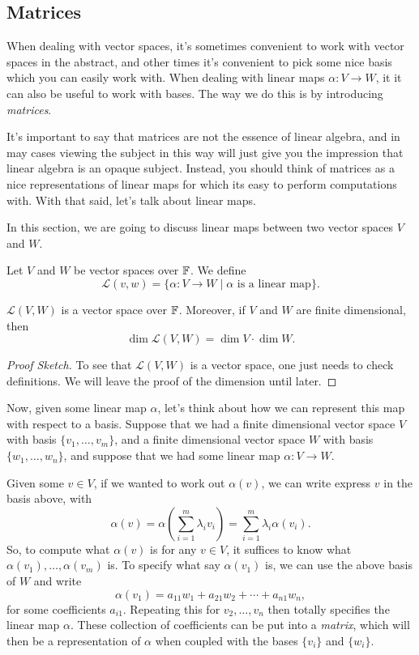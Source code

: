 \documentclass[a4paper]{scrartcl}
\begin{document}
\subsection{Matrices}

When dealing with vector spaces, it's sometimes convenient to work with vector spaces in the abstract, and other times it's convenient to pick some nice basis which you can easily work with.
When dealing with linear maps $\alpha: V \rightarrow W$, it it can also be useful to work with bases. The way we do this is by introducing \emph{matrices}.

It's important to say that matrices are not the essence of linear algebra, and in may cases viewing the subject in this way will just give you the impression that linear algebra is an opaque subject. Instead, you should think of matrices as a nice representations of linear maps for which its easy to perform computations with.
With that said, let's talk about linear maps.

In this section, we are going to discuss linear maps between two vector spaces $V$ and $W$.

\begin{definition}
    Let $V$ and $W$ be vector spaces over $\mathbb{F}$. We define
    $$
    \mathcal{L}(v, w) = \{\alpha: V \rightarrow W \mid \alpha \text{ is a linear map}\}.
    $$
\end{definition}

\begin{proposition}
    $\mathcal{L}(V, W)$ is a vector space over $\mathbb{F}$. Moreover, if $V$ and $W$ are finite dimensional, then
    $$
    \dim \mathcal{L}(V, W) = \dim V \cdot \dim W.
    $$
\end{proposition}
\begin{proof}[Proof Sketch]    
    To see that $\mathcal{L}(V, W)$ is a vector space, one just needs to check definitions. We will leave the proof of the dimension until later.
\end{proof}

Now, given some linear map $\alpha$, let's think about how we can represent this map with respect to a basis.
Suppose that we had a finite dimensional vector space $V$ with basis $\{v_1, \dots, v_m\}$, and a finite dimensional vector space $W$ with basis $\{w_1, \dots, w_n\}$, and suppose that we had some linear map $\alpha : V \rightarrow W$.

Given some $v \in V$, if we wanted to work out $\alpha(v)$, we can write express $v$ in the basis above, with
$$
\alpha(v) = \alpha\left(\sum_{i = 1}^m \lambda_i v_i\right) = \sum_{i = 1}^m \lambda_i \alpha(v_i).
$$
So, to compute what $\alpha(v)$ is for any $v \in V$, it suffices to know what $\alpha(v_1), \dots, \alpha(v_m)$ is. To specify what say $\alpha(v_1)$ is, we can use the above basis of $W$ and write
$$
\alpha(v_1) = a_{11} w_1 + a_{21} w_2 + \cdots + a_{n1} w_n,
$$
for some coefficients $a_{i1}$. Repeating this for $v_2, \dots, v_n$ then totally specifies the linear map $\alpha$.
These collection of coefficients can be put into a \emph{matrix}, which will then be a representation of $\alpha$ when coupled with the bases $\{v_i\}$ and $\{w_i\}$.
\end{document}
